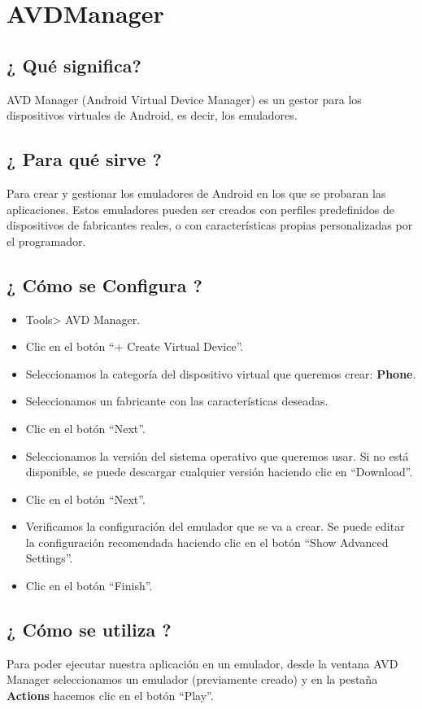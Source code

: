 \section{AVDManager}
\subsection{¿ Qué significa?}
	AVD Manager (Android Virtual Device Manager) es un gestor para los dispositivos virtuales de Android, es decir, los emuladores. 
\subsection{¿ Para qué sirve ?}
Para crear y gestionar los emuladores de Android en los que se probaran las aplicaciones. Estos emuladores pueden ser creados con perfiles predefinidos de dispositivos de fabricantes reales, o con características propias personalizadas por el programador.
\subsection{¿ Cómo se Configura ?}
\begin{itemize}
	\item Tools> AVD Manager.
	\item Clic en el botón ``+ Create Virtual Device''.
	\item Seleccionamos la categoría del dispositivo virtual que queremos crear: \textbf{Phone}.
	\item Seleccionamos un fabricante con las características deseadas.
	\item Clic en el botón ``Next''.
	\item Seleccionamos la versión del sistema operativo que queremos usar. Si no está disponible, se puede descargar cualquier versión haciendo clic en ``Download''.
	\item Clic en el botón ``Next''.
	\item Verificamos la configuración del emulador que se va a crear. Se puede editar la configuración recomendada haciendo clic en el botón ``Show Advanced Settings''.
	\item Clic en el botón ``Finish''.
\end{itemize}
\subsection{¿ Cómo se utiliza ?}
Para poder ejecutar nuestra aplicación en un emulador, desde la ventana AVD Manager seleccionamos un emulador (previamente creado) y en la pestaña \textbf{Actions} hacemos clic en el botón ``Play''.

